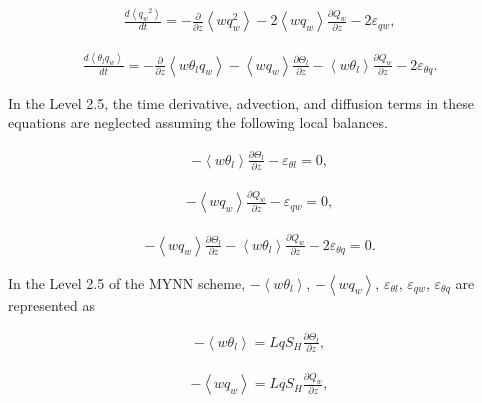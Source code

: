 \begin{eqnarray}
\frac{d\left\langle {q_w}^{2}\right\rangle}{d t}=-\frac{\partial}{\partial z}\left\langle w q_{w}^{2}\right\rangle-2\left\langle w q_{w}\right\rangle \frac{\partial Q_{w}}{\partial z}-2 \varepsilon_{q w},
\end{eqnarray}

\begin{eqnarray}
\frac{d\left\langle\theta_{l} q_{w}\right\rangle}{d t}=-\frac{\partial}{\partial z}\left\langle w \theta_{l} q_{w}\right\rangle-\left\langle w q_{w}\right\rangle \frac{\partial \Theta_{l}}{\partial z}-\left\langle w \theta_{l}\right\rangle \frac{\partial Q_{w}}{\partial z}-2 \varepsilon_{\theta q}.
\end{eqnarray}

In the Level 2.5, the time derivative, advection, and diffusion terms in
these equations are neglected assuming the following local balances.

\begin{eqnarray} -\left\langle w \theta_{l}\right\rangle \frac{\partial \Theta_{l}}{\partial z}-\varepsilon_{\theta l} = 0 \label{p-dif.6},\end{eqnarray}

\begin{eqnarray} -\left\langle w q_{w}\right\rangle \frac{\partial Q_{w}}{\partial z}-\varepsilon_{q w} = 0 \label{p-dif.7},\end{eqnarray}

\begin{eqnarray} -\left\langle w q_{w}\right\rangle \frac{\partial \Theta_{l}}{\partial z}-\left\langle w \theta_{l}\right\rangle \frac{\partial Q_{w}}{\partial z}-2 \varepsilon_{\theta q} = 0 \label{p-dif.8}.\end{eqnarray}

In the Level 2.5 of the MYNN scheme,
\(-\left\langle w \theta_{l}\right\rangle\),
\(-\left\langle w q_{w}\right\rangle\), \(\varepsilon_{\theta l}\),
\(\varepsilon_{q w}\), \(\varepsilon_{\theta q}\) are represented as

\begin{eqnarray} -\left\langle w \theta_{l}\right\rangle = LqS_H \frac{\partial \Theta_{l}}{\partial z} \label{p-dif.9},\end{eqnarray}

\begin{eqnarray} -\left\langle w q_{w}\right\rangle = LqS_H \frac{\partial Q_{w}}{\partial z} \label{p-dif.10},\end{eqnarray}

